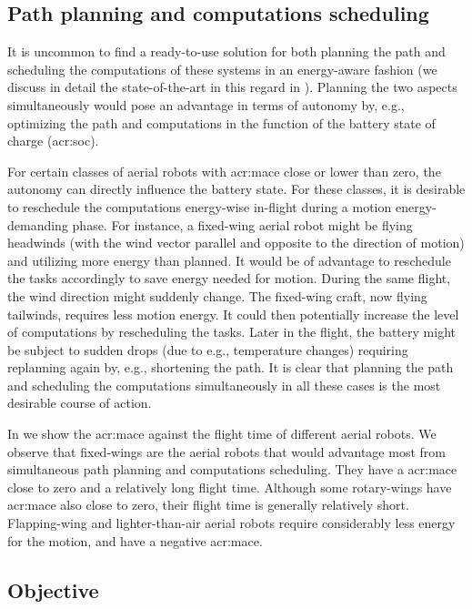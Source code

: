 \subsection{Path planning and computations scheduling}

It is uncommon to find a ready-to-use solution for both planning the path and scheduling the computations of these systems in an energy-aware fashion (we discuss in detail the state-of-the-art in this regard in ). Planning the two aspects simultaneously would pose an advantage in terms of autonomy by, e.g., optimizing the path and computations in the function of the battery state of charge (\Gls{acr:soc}). 

For certain classes of aerial robots with \Gls{acr:mace} close or lower than zero, the autonomy can directly influence the battery state. For these classes, it is desirable to reschedule the computations energy-wise in-flight during a motion energy-demanding phase. For instance, a fixed-wing aerial robot might be flying headwinds (with the wind vector parallel and opposite to the direction of motion) and utilizing more energy than planned. It would be of advantage to reschedule the tasks accordingly to save energy needed for motion. During the same flight, the wind direction might suddenly change. The fixed-wing craft, now flying tailwinds, requires less motion energy. It could then potentially increase the level of computations by rescheduling the tasks. Later in the flight, the battery might be subject to sudden drops (due to e.g., temperature changes) requiring replanning again by, e.g., shortening the path. It is clear that planning the path and scheduling the computations simultaneously in all these cases is the most desirable course of action.

In  we show the \Gls{acr:mace} against the flight time of different aerial robots. We observe that fixed-wings are the aerial robots that would advantage most from simultaneous path planning and computations scheduling. They have a \Gls{acr:mace} close to zero and a relatively long flight time. Although some rotary-wings have \Gls{acr:mace} also close to zero, their flight time is generally relatively short. Flapping-wing and lighter-than-air aerial robots require considerably less energy for the motion, and have a negative \Gls{acr:mace}.

\subsection{Objective}
\label{sec:objective}

